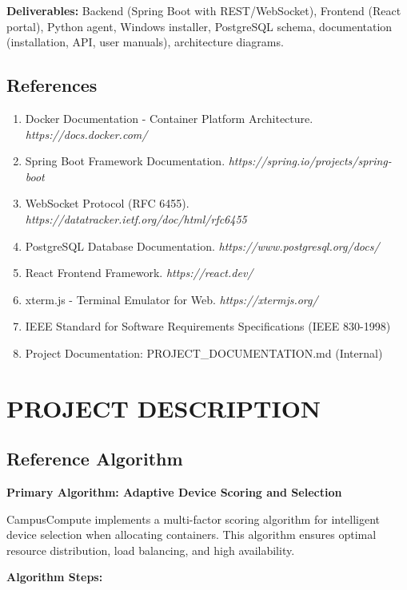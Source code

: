 \documentclass[12pt,a4paper]{article}
\begin{document}
\textbf{Deliverables:} Backend (Spring Boot with REST/WebSocket), Frontend (React portal), Python agent, Windows installer, PostgreSQL schema, documentation (installation, API, user manuals), architecture diagrams.

\subsection{References}

\begin{enumerate}[noitemsep]
    \item Docker Documentation - Container Platform Architecture. \textit{https://docs.docker.com/}
    \item Spring Boot Framework Documentation. \textit{https://spring.io/projects/spring-boot}
    \item WebSocket Protocol (RFC 6455). \textit{https://datatracker.ietf.org/doc/html/rfc6455}
    \item PostgreSQL Database Documentation. \textit{https://www.postgresql.org/docs/}
    \item React Frontend Framework. \textit{https://react.dev/}
    \item xterm.js - Terminal Emulator for Web. \textit{https://xtermjs.org/}
    \item IEEE Standard for Software Requirements Specifications (IEEE 830-1998)
    \item Project Documentation: PROJECT\_DOCUMENTATION.md (Internal)
\end{enumerate}

\section{PROJECT DESCRIPTION}

\subsection{Reference Algorithm}

\textbf{Primary Algorithm: Adaptive Device Scoring and Selection}

CampusCompute implements a multi-factor scoring algorithm for intelligent device selection when allocating containers. This algorithm ensures optimal resource distribution, load balancing, and high availability.

\textbf{Algorithm Steps:}
\end{document}
